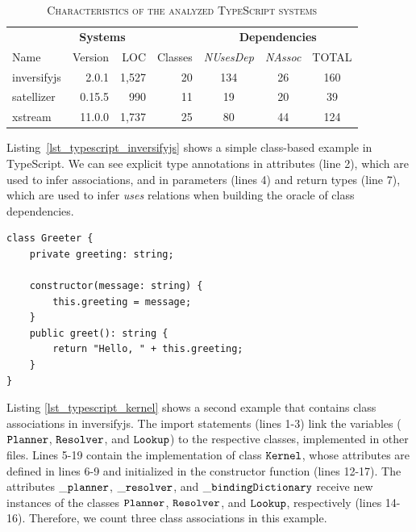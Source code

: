 \documentclass[review]{elsarticle}
\newcommand{\mcode}[1]{$\tt #1$}
\begin{document}
\begin{table}[!ht]
	\scriptsize	
	\centering
	\caption{\textsc{Characteristics of the analyzed TypeScript systems}}
	\tabcolsep=0.11cm
	\begin{tabular}{lrrr|ccc}
		\toprule
		\multicolumn{4}{c|}{\textbf{Systems}} & \multicolumn{3}{c}{\textbf{Dependencies}}  \\
		Name & Version & LOC & Classes & \textit{NUsesDep} & \textit{NAssoc} & TOTAL  \\
		\midrule
		{\sc inversifyjs} & 2.0.1   & 1,527 &         20 & 134 & 26 & 160  \\
		{\sc satellizer}   & 0.15.5 &   990 &          11 & 19 & 20 & 39  \\
		{\sc xstream}    &  11.0.0 & 1,737 &         25 & 80 &  44 & 124  \\
		\bottomrule
	\end{tabular}
	\label{tab:dataset}
\end{table}



Listing~\ref{lst_typescript_inversifyjs} shows a simple class-based example in TypeScript. We can see explicit type annotations in attributes (line 2), which are used to infer associations, and in parameters (lines 4) and return types (line 7), which are used to infer \textit{uses} relations when building the oracle of class dependencies. %

\begin{lstlisting}[caption=Example of class in TypeScript, label=lst_typescript_inversifyjs, emph={[2]string,boolean},emphstyle={[2]\ttfamily\bfseries\color{darkgreen}}]
class Greeter {
	private greeting: string;

	constructor(message: string) {
		this.greeting = message;
	}
	public greet(): string {
		return "Hello, " + this.greeting;
	}
}  
\end{lstlisting} 

Listing \ref{lst_typescript_kernel} shows a second example that contains class associations in {\sc inversifyjs}. The import statements (lines 1-3) link the variables (\mcode{Planner}, \mcode{Resolver}, and \mcode{Lookup}) to the respective classes, implemented in other files. Lines 5-19 contain the implementation of class \mcode{Kernel}, whose attributes are defined in lines 6-9 and initialized in the constructor function (lines 12-17). The attributes \mcode{\_planner}, \mcode{\_resolver}, and \mcode{\_bindingDictionary} receive new instances of the classes \mcode{Planner}, \mcode{Resolver}, and \mcode{Lookup}, respectively (lines 14-16). Therefore, we count three class associations in this example.
\end{document}
